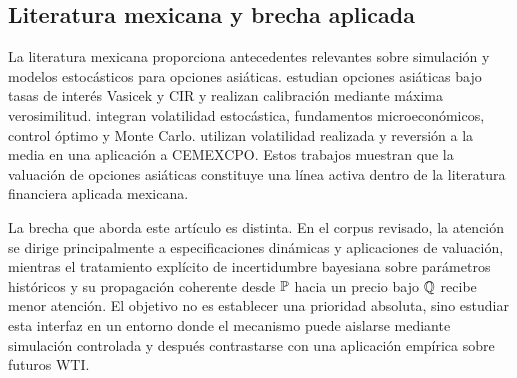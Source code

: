 \subsection{Literatura mexicana y brecha aplicada}

La literatura mexicana proporciona antecedentes relevantes sobre simulación y modelos estocásticos para opciones asiáticas. \citet{ortiz2016} estudian opciones asiáticas bajo tasas de interés Vasicek y CIR y realizan calibración mediante máxima verosimilitud. \citet{matias2019} integran volatilidad estocástica, fundamentos microeconómicos, control óptimo y Monte Carlo. \citet{ortizjimenez2026} utilizan volatilidad realizada y reversión a la media en una aplicación a CEMEXCPO. Estos trabajos muestran que la valuación de opciones asiáticas constituye una línea activa dentro de la literatura financiera aplicada mexicana.

La brecha que aborda este artículo es distinta. En el corpus revisado, la atención se dirige principalmente a especificaciones dinámicas y aplicaciones de valuación, mientras el tratamiento explícito de incertidumbre bayesiana sobre parámetros históricos y su propagación coherente desde $\mathbb{P}$ hacia un precio bajo $\mathbb{Q}$ recibe menor atención. El objetivo no es establecer una prioridad absoluta, sino estudiar esta interfaz en un entorno donde el mecanismo puede aislarse mediante simulación controlada y después contrastarse con una aplicación empírica sobre futuros WTI.
